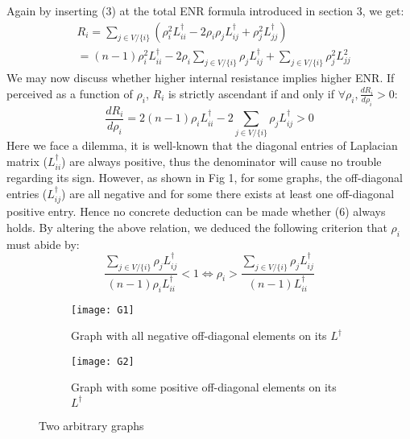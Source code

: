 \documentclass{article}
\begin{document}
	Again by inserting (3) at the total ENR formula introduced in section 3, we get:
	\begin{equation}
	\begin{aligned}
		&R_i = \sum_{j\in V/ \{i\}} \left( \rho_i^{2} L_{ii}^{\dag} - 2\rho_i \rho_j L_{ij}^{\dag} + \rho_j^{2} L_{jj}^{\dag} \right) \\
		&=(n-1)\rho_i^{2}L_{ii}^{\dag}-2\rho_i \sum_{j\in V/ \{i\}} \rho_j L_{ij}^{\dag} + \sum_{j\in V/ \{i\}} \rho_j^{2} L_{jj}^{2}
	\end{aligned}
	\end{equation}
	We may now discuss whether higher internal resistance implies higher ENR. If perceived as a function of $\rho_i$, $R_i$ is strictly ascendant if and only if $\forall \rho_i, \frac{dR_i}{d\rho_i} > 0$:
	\begin{equation}
		\frac{dR_i}{d \rho_i} = 2(n-1)\rho_i L_{ii}^{\dag} - 2\sum_{j\in V / \{i\}} \rho_j L_{ij}^{\dag} > 0
	\end{equation}
	Here we face a dilemma, it is well-known that the diagonal entries of Laplacian matrix ($L_{ii}^{\dag}$) are always positive, thus the denominator will cause no trouble regarding its sign. However, as shown in Fig 1, for some graphs, the off-diagonal entries ($L_{ij}^{\dag}$) are all negative and for some there exists at least one off-diagonal positive entry. Hence no concrete deduction can be made whether (6) always holds. By altering the above relation, we deduced the following criterion that $\rho_i$ must abide by:
	\begin{equation}
		\frac{\sum_{j\in V / \{i\}} \rho_j L_{ij}^{\dag}} {(n-1)\rho_i L_{ii}^{\dag}} < 1 \Longleftrightarrow \rho_i > \frac{\sum_{j\in V / \{i\}} \rho_j L_{ij}^{\dag}} {(n-1) L_{ii}^{\dag}}
	\end{equation}
	\linebreak
	\begin{figure}[t!]
		\centering
		\begin{subfigure}[t]{0.495\textwidth}
			\centering
			\texttt{[image: G1]}
			\caption{Graph with all negative off-diagonal elements on its $L^{\dag}$}
			\label{fig:3-a}
		\end{subfigure}
		\hfill
		\begin{subfigure}[t]{0.495\textwidth}
			\centering
			\texttt{[image: G2]}
			\caption{Graph with some positive off-diagonal elements on its $L^{\dag}$}
			\label{fig:3-b}
		\end{subfigure}
		\caption{Two arbitrary graphs}
		\label{fig:3}
	\end{figure}
	
\end{document}
